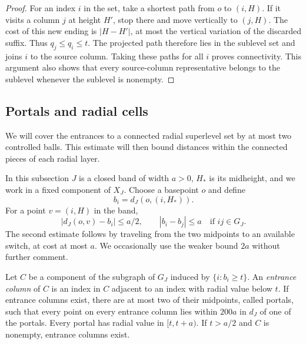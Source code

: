 \begin{proof}
For an index $i$ in the set, take a shortest path from $o$ to $(i,H)$.
If it visits a column $j$ at height $H'$, stop there and move vertically
to $(j,H)$.  The cost of this new ending is $|H-H'|$, at most the vertical
variation of the discarded suffix.  Thus $q_j\le q_i\le t$.  The projected
path therefore lies in the sublevel set and joins $i$ to the source column.
Taking these paths for all $i$ proves connectivity.  This argument also
shows that every source-column representative belongs to the sublevel
whenever the sublevel is nonempty.
\end{proof}

\subsection{Portals and radial cells}

We will cover the entrances to a connected radial superlevel set by at
most two controlled balls.  This estimate will then bound distances
within the connected pieces of each radial layer.

In this subsection $J$ is a closed band of width $a>0$, $H_*$ is its
midheight, and we work in a fixed component of $X_J$.  Choose a basepoint
$o$ and define
\[
 b_i=d_J(o,(i,H_*)).
\]
For a point $v=(i,H)$ in the band,
\begin{equation}\label{geo:radial-estimates}
 \bigl|d_J(o,v)-b_i\bigr|\le a/2,
 \qquad |b_i-b_j|\le a\quad\text{if }ij\in G_J.
\end{equation}
The second estimate follows by traveling from the two midpoints to an
available switch, at cost at most $a$.  We occasionally use the weaker
bound $2a$ without further comment.

\begin{lemma}\label{geo:portals}
Let $C$ be a component of the subgraph of $G_J$ induced by $\{i:b_i\ge t\}$.
An \emph{entrance column} of $C$ is an index in $C$ adjacent to an index
with radial value below $t$.  If entrance columns exist, there are at most
two of their midpoints, called portals, such that every point on every
entrance column lies within $200a$ in $d_J$ of one of the portals.
Every portal has radial value in $[t,t+a)$.  If $t>a/2$ and $C$ is nonempty,
entrance columns exist.
\end{lemma}

